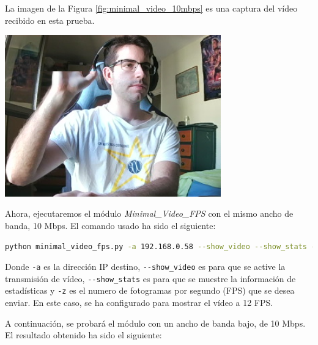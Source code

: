La imagen de la Figura \ref{fig:minimal_video_10mbps} es una captura del vídeo recibido en esta prueba.
\begin{center}
  \includegraphics[width = 0.7\textwidth]{images/VideoRecibido2.1.png}
  \label{fig:minimal_video_10mbps}
\end{center}

\newpage

Ahora, ejecutaremos el módulo \textit{Minimal\_Video\_FPS} con el mismo ancho de banda, 10 Mbps. El comando usado ha sido el siguiente:
\begin{lstlisting}[language=bash, basicstyle=\ttfamily\scriptsize]
    python minimal_video_fps.py -a 192.168.0.58 --show_video --show_stats -z 12
\end{lstlisting}
Donde \verb|-a| es la dirección IP destino, \verb|--show_video| es para que se active la transmisión de vídeo, \verb|--show_stats| es para que se muestre la información de estadísticas y \verb|-z| es el numero de fotogramas por segundo (FPS) que se desea enviar. En este caso, se ha configurado para mostrar el vídeo a 12 FPS.

A continuación, se probará el módulo con un ancho de banda bajo, de 10 Mbps. El resultado obtenido ha sido el siguiente:
\vspace{\baselineskip}

